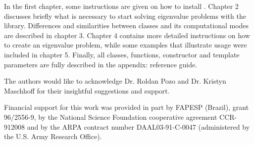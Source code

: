 In the first chapter, some instructions are given on how to install \ARPP{}. Chapter 2 discusses briefly what is necessary to start solving eigenvalue problems with the library. Differences and similarities between \ARPP{} classes and its computational modes are described in chapter 3. Chapter 4 contains more detailed instructions on how to create an eigenvalue problem, while some examples that illustrate \ARPP{} usage were included in chapter 5. Finally, all classes, functions, constructor and template parameters are fully described in the appendix: \ARPP{} reference guide.

The authors would like to acknowledge Dr. Roldan Pozo and Dr. Kristyn Maschhoff for their insightful suggestions and support.

Financial support for this work was provided in part by FAPESP (Brazil), grant 96/2556-9, by the National Science Foundation cooperative agreement CCR-912008 and by the ARPA contract number DAAL03-91-C-0047 (administered by the U.S. Army Research Office).
